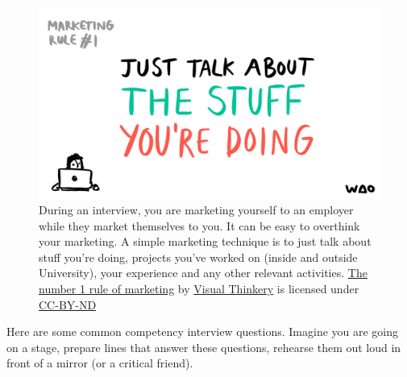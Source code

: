 \documentclass[
]{book}
\begin{document}
\begin{figure}

{\centering \includegraphics[width=0.99\linewidth]{images/Marketing-rule-No1} 

}

\caption{During an interview, you are marketing yourself to an employer while they market themselves to you. It can be easy to overthink your marketing. A simple marketing technique is to just talk about stuff you're doing, projects you've worked on (inside and outside University), your experience and any other relevant activities. \href{https://bryanmmathers.com/the-1-rule-of-marketing/}{The number 1 rule of marketing} by \href{https://visualthinkery.com/}{Visual Thinkery} is licensed under \href{https://creativecommons.org/licenses/by-nd/4.0/}{CC-BY-ND}}\label{fig:overthinking-fig}
\end{figure}



Here are some common competency interview questions. Imagine you are going on a stage, prepare lines that answer these questions, rehearse them out loud in front of a mirror (or a critical friend).
\end{document}
